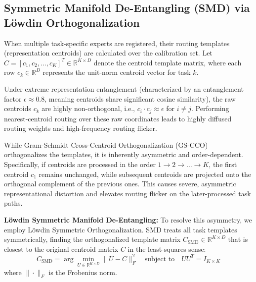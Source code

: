 \subsection{Symmetric Manifold De-Entangling (SMD) via L{\"o}wdin Orthogonalization}
\label{sec:appendix_smd}

When multiple task-specific experts are registered, their routing templates (representation centroids) are calculated over the calibration set. Let $C = [c_1, c_2, \dots, c_K]^T \in \mathbb{R}^{K \times D}$ denote the centroid template matrix, where each row $c_k \in \mathbb{R}^D$ represents the unit-norm centroid vector for task $k$.

Under extreme representation entanglement (characterized by an entanglement factor $\epsilon \approx 0.8$, meaning centroids share significant cosine similarity), the raw centroids $c_k$ are highly non-orthogonal, i.e., $c_i \cdot c_j \approx \epsilon$ for $i \neq j$. Performing nearest-centroid routing over these raw coordinates leads to highly diffused routing weights and high-frequency routing flicker.

While Gram-Schmidt Cross-Centroid Orthogonalization (GS-CCO) orthogonalizes the templates, it is inherently asymmetric and order-dependent. Specifically, if centroids are processed in the order $1 \rightarrow 2 \rightarrow \dots \rightarrow K$, the first centroid $c_1$ remains unchanged, while subsequent centroids are projected onto the orthogonal complement of the previous ones. This causes severe, asymmetric representational distortion and elevates routing flicker on the later-processed task paths.

\textbf{L{\"o}wdin Symmetric Manifold De-Entangling:} To resolve this asymmetry, we employ L{\"o}wdin Symmetric Orthogonalization. SMD treats all task templates symmetrically, finding the orthogonalized template matrix $C_{\text{SMD}} \in \mathbb{R}^{K \times D}$ that is closest to the original centroid matrix $C$ in the least-squares sense:
\begin{equation}
    C_{\text{SMD}} = \arg\min_{U \in \mathbb{R}^{K \times D}} \| U - C \|_F^2 \quad \text{subject to} \quad U U^T = I_{K \times K}
\end{equation}
where $\| \cdot \|_F$ is the Frobenius norm.

